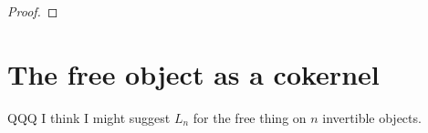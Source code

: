 \documentclass{amsbook} %
\newcommand{\ELn}{E\Lambda(\underline{n})}
\numberwithin{section}{chapter}
\begin{document}
\begin{proof}
%
\end{proof}


\section{The free object as a cokernel}
\label{colimalgebra} 

QQQ I think I might suggest $L_n$ for the free thing on $n$ invertible objects.

\end{document}
